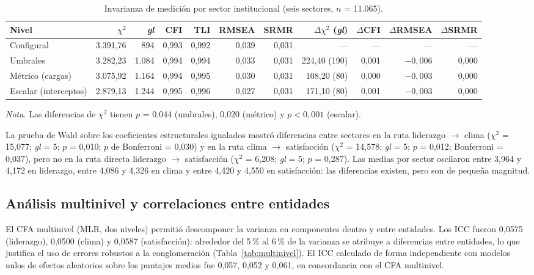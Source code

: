 \documentclass[11pt,a4paper]{article}
\newcommand{\chisq}{$\chi^2$}
\newcommand{\df}{\textit{gl}}
\begin{document}
\begin{table}[htbp]
\centering
\caption{Invarianza de medición por sector institucional (seis sectores, $n$ = 11.065).}
\label{tab:invsector}
\footnotesize
\setlength{\tabcolsep}{4pt}
\begin{tabular}{@{}lrrrrrrrrrr@{}}
\toprule
Nivel & \chisq & \df & CFI & TLI & RMSEA & SRMR & $\Delta\chi^2$ (\df) & $\Delta$CFI & $\Delta$RMSEA & $\Delta$SRMR \\
\midrule
Configural & 3.391,76 & 894 & 0,993 & 0,992 & 0,039 & 0,031 & --- & --- & --- & --- \\
Umbrales & 3.282,23 & 1.084 & 0,994 & 0,994 & 0,033 & 0,031 & 224,40 (190) & 0,001 & $-0,006$ & 0,000 \\
Métrico (cargas) & 3.075,92 & 1.164 & 0,994 & 0,995 & 0,030 & 0,031 & 108,20 (80) & 0,000 & $-0,003$ & 0,000 \\
Escalar (interceptos) & 2.879,13 & 1.244 & 0,995 & 0,996 & 0,027 & 0,031 & 171,10 (80) & 0,001 & $-0,003$ & 0,000 \\
\bottomrule
\end{tabular}

\vspace{2pt}
\parbox{0.95\textwidth}{\footnotesize \textit{Nota.} Las diferencias de $\chi^2$ tienen
$p$ = 0,044 (umbrales), 0,020 (métrico) y $p < 0,001$ (escalar).}
\end{table}

La prueba de Wald sobre los coeficientes estructurales igualados mostró diferencias entre
sectores en la ruta liderazgo $\rightarrow$ clima ($\chi^2$ = 15,077; \df{} = 5;
$p$ = 0,010; $p$ de Bonferroni = 0,030) y en la ruta clima $\rightarrow$ satisfacción
($\chi^2$ = 14,578; \df{} = 5; $p$ = 0,012; Bonferroni = 0,037), pero no en la ruta directa
liderazgo $\rightarrow$ satisfacción ($\chi^2$ = 6,208; \df{} = 5; $p$ = 0,287). Las medias
por sector oscilaron entre 3,964 y 4,172 en liderazgo, entre 4,086 y 4,326 en clima y entre
4,420 y 4,550 en satisfacción: las diferencias existen, pero son de pequeña magnitud.

\subsection{Análisis multinivel y correlaciones entre entidades}

El CFA multinivel (MLR, dos niveles) permitió descomponer la varianza en componentes dentro y
entre entidades. Los ICC fueron 0,0575 (liderazgo), 0,0500 (clima) y 0,0587 (satisfacción):
alrededor del 5\,\% al 6\,\% de la varianza se atribuye a diferencias entre entidades, lo que
justifica el uso de errores robustos a la conglomeración (Tabla~\ref{tab:multinivel}). El ICC
calculado de forma independiente con modelos nulos de efectos aleatorios sobre los puntajes
medios fue 0,057, 0,052 y 0,061, en concordancia con el CFA multinivel.
\end{document}
